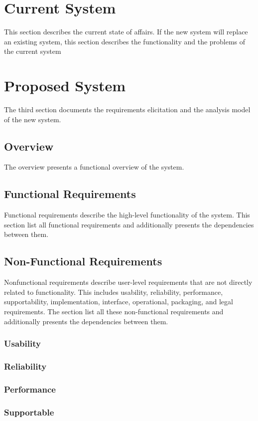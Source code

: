 \documentclass[a4paper,12pt]{scrartcl}
\newenvironment{subs}
  {\adjustwidth{3em}{0pt}}
  {\endadjustwidth}
\newenvironment{subsubs}
  {\adjustwidth{2em}{0pt}}
  {\endadjustwidth}
\begin{document}
\section{Current System}
This section describes the current state of affairs. If the new system will replace an existing system, this section describes the functionality and the problems of the current system

\section{Proposed System}
The third section documents the requirements elicitation and the analysis model of the new system.
\nopagebreak
\begin{subs}
\subsection{Overview}
The overview presents a functional overview of the system.
\subsection{Functional Requirements}
Functional requirements describe the high-level functionality of the system. This section list all functional requirements and additionally presents the dependencies between them.
\subsection{Non-Functional Requirements}
Nonfunctional requirements describe user-level requirements that are not directly related to functionality. This includes usability, reliability, performance, supportability, implementation, interface, operational, packaging, and legal requirements. The section list all these non-functional requirements and additionally presents the dependencies between them.
\begin{subsubs}
\subsubsection{Usability}
\subsubsection{Reliability}
\subsubsection{Performance}
\subsubsection{Supportable}

\end{subsubs}
\end{subs}
\end{document}
